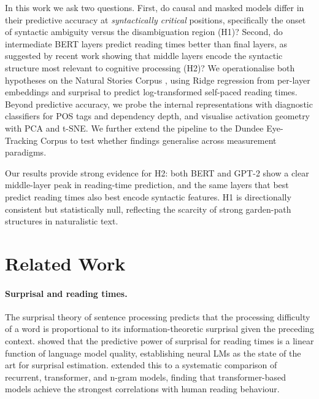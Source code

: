 \documentclass[11pt]{article}
\begin{document}
In this work we ask two questions.
First, do causal and masked models differ in their predictive accuracy at \emph{syntactically critical} positions, specifically the onset of syntactic ambiguity versus the disambiguation region (H1)?
Second, do intermediate BERT layers predict reading times better than final layers, as suggested by recent work showing that middle layers encode the syntactic structure most relevant to cognitive processing \citep{jawahar2019,lan2020} (H2)?
We operationalise both hypotheses on the Natural Stories Corpus \citep{futrell2021}, using Ridge regression from per-layer embeddings and surprisal to predict log-transformed self-paced reading times.
Beyond predictive accuracy, we probe the internal representations with diagnostic classifiers for POS tags and dependency depth, and visualise activation geometry with PCA and t-SNE.
We further extend the pipeline to the Dundee Eye-Tracking Corpus \citep{kennedy2003} to test whether findings generalise across measurement paradigms.

Our results provide strong evidence for H2: both BERT and GPT-2 show a clear middle-layer peak in reading-time prediction, and the same layers that best predict reading times also best encode syntactic features.
H1 is directionally consistent but statistically null, reflecting the scarcity of strong garden-path structures in naturalistic text.

\section{Related Work}

\paragraph{Surprisal and reading times.}
The surprisal theory of sentence processing \citep{hale2001,levy2008} predicts that the processing difficulty of a word is proportional to its information-theoretic surprisal given the preceding context.
\citet{goodkind2018} showed that the predictive power of surprisal for reading times is a linear function of language model quality, establishing neural LMs as the state of the art for surprisal estimation.
\citet{wilcox2020} extended this to a systematic comparison of recurrent, transformer, and n-gram models, finding that transformer-based models achieve the strongest correlations with human reading behaviour.
\end{document}
